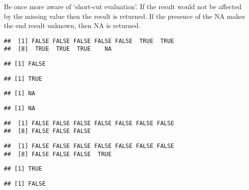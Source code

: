 \documentclass[paper=a4,10pt,div=17,headsepline,BCOR=12mm,twoside,open=right]{scrbook}\usepackage{knitr}
\begin{document}
Be once more aware of `short-cut evaluation'. If the result would not be affected by the missing value then the result is returned. If the presence of the NA makes the end result unknown, then NA is returned.

\begin{knitrout}\footnotesize
{}\color{fgcolor}\begin{kframe}
\begin{alltt}
 \hlkwb{<-}  \hlstd{)}
 \hlopt{>} 
\end{alltt}
\begin{verbatim}
##  [1] FALSE FALSE FALSE FALSE FALSE  TRUE  TRUE
##  [8]  TRUE  TRUE  TRUE    NA
\end{verbatim}
\begin{alltt}
 \hlopt{>} \hlstd{)}
\end{alltt}
\begin{verbatim}
## [1] FALSE
\end{verbatim}
\begin{alltt}
 \hlopt{>} \hlstd{)}
\end{alltt}
\begin{verbatim}
## [1] TRUE
\end{verbatim}
\begin{alltt}
 \hlopt{<} \hlstd{)}
\end{alltt}
\begin{verbatim}
## [1] NA
\end{verbatim}
\begin{alltt}
 \hlopt{>} \hlstd{)}
\end{alltt}
\begin{verbatim}
## [1] NA
\end{verbatim}
\begin{alltt}
\end{alltt}
\begin{verbatim}
##  [1] FALSE FALSE FALSE FALSE FALSE FALSE FALSE
##  [8] FALSE FALSE FALSE
\end{verbatim}
\begin{alltt}
\end{alltt}
\begin{verbatim}
##  [1] FALSE FALSE FALSE FALSE FALSE FALSE FALSE
##  [8] FALSE FALSE FALSE  TRUE
\end{verbatim}
\begin{alltt}
\hlstd{(}
\end{alltt}
\begin{verbatim}
## [1] TRUE
\end{verbatim}
\begin{alltt}
\hlstd{(}
\end{alltt}
\begin{verbatim}
## [1] FALSE
\end{verbatim}
\end{kframe}
\end{knitrout}
\end{document}
